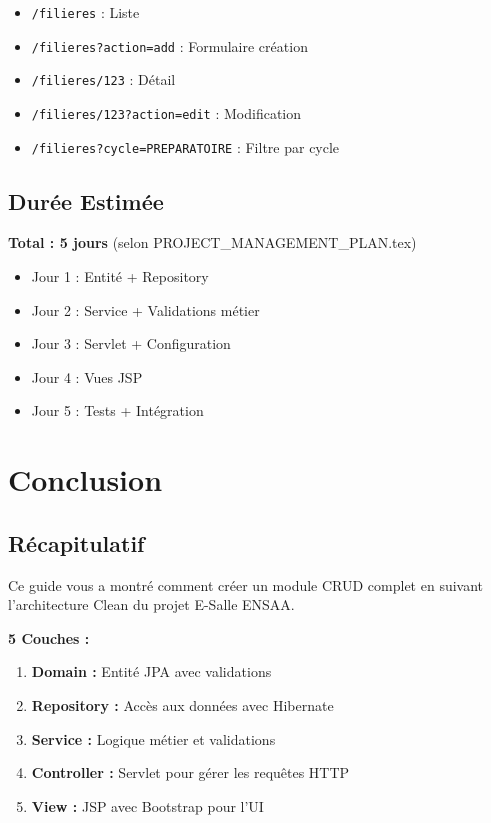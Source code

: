 \documentclass[12pt,a4paper]{article}
\begin{document}
\begin{itemize}
    \item \texttt{/filieres} : Liste
    \item \texttt{/filieres?action=add} : Formulaire création
    \item \texttt{/filieres/123} : Détail
    \item \texttt{/filieres/123?action=edit} : Modification
    \item \texttt{/filieres?cycle=PREPARATOIRE} : Filtre par cycle
\end{itemize}

\subsection{Durée Estimée}

\textbf{Total : 5 jours} (selon PROJECT\_MANAGEMENT\_PLAN.tex)
\begin{itemize}
    \item Jour 1 : Entité + Repository
    \item Jour 2 : Service + Validations métier
    \item Jour 3 : Servlet + Configuration
    \item Jour 4 : Vues JSP
    \item Jour 5 : Tests + Intégration
\end{itemize}

\newpage

\section{Conclusion}

\subsection{Récapitulatif}

Ce guide vous a montré comment créer un module CRUD complet en suivant l'architecture Clean du projet E-Salle ENSAA.

\textbf{5 Couches :}
\begin{enumerate}
    \item \textbf{Domain :} Entité JPA avec validations
    \item \textbf{Repository :} Accès aux données avec Hibernate
    \item \textbf{Service :} Logique métier et validations
    \item \textbf{Controller :} Servlet pour gérer les requêtes HTTP
    \item \textbf{View :} JSP avec Bootstrap pour l'UI
\end{enumerate}
\end{document}
